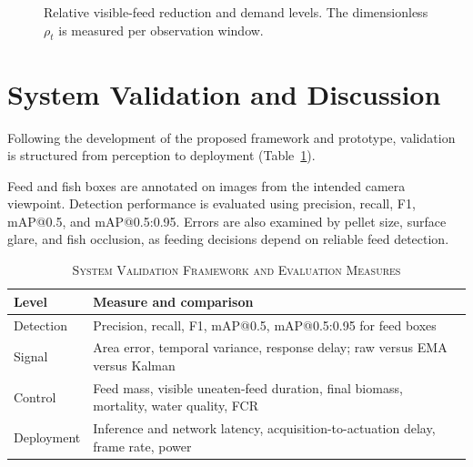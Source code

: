 \documentclass[10pt,conference,letterpaper]{IEEEtran}
\begin{document}
\begin{figure}[H]
\centering
{}
\caption{Relative visible-feed reduction and demand levels. The dimensionless $\rho_t$ is measured per observation window.}
\label{fig:demand}
\end{figure}

\section{System Validation and Discussion}
Following the development of the proposed framework and prototype, validation is structured from perception to deployment (Table~\ref{tab:validation}).

Feed and fish boxes are annotated on images from the intended camera viewpoint. Detection performance is evaluated using precision, recall, F1, mAP@0.5, and mAP@0.5:0.95. Errors are also examined by pellet size, surface glare, and fish occlusion, as feeding decisions depend on reliable feed detection.

\begin{table}[H]
\caption{\textsc{System Validation Framework and Evaluation Measures}}
\label{tab:validation}
\centering
\small
\renewcommand{\arraystretch}{1.0}
\begin{tabularx}{\columnwidth}{@{}p{}>{\raggedright\arraybackslash}X@{}}
\hline
\textbf{Level} & \textbf{Measure and comparison} \\ \hline
Detection & Precision, recall, F1, mAP@0.5, mAP@0.5:0.95 for feed boxes \\
Signal & Area error, temporal variance, response delay; raw versus EMA versus Kalman \\
Control & Feed mass, visible uneaten-feed duration, final biomass, mortality, water quality, FCR \\
Deployment & Inference and network latency, acquisition-to-actuation delay, frame rate, power \\ \hline
\end{tabularx}
\end{table}
\end{document}
